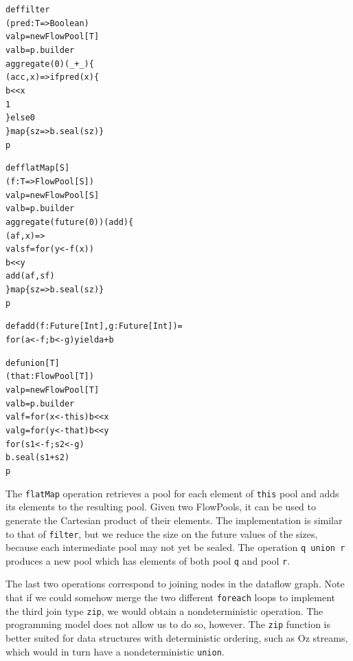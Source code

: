 \documentclass[runningheads,a4paper]{llncs}
\begin{document}
\noindent
\begin{minipage}[b]{4 cm}
\begin{alltt}
{\scriptsize
def filter
  (pred: T => Boolean)
  val p = new FlowPool[T]
  val b = p.builder
  aggregate(0)(_ + _) \{
    (acc, x) => if pred(x) \{
      b << x
      1
    \} else 0
  \} map \{ sz => b.seal(sz) \}
  p



}
\end{alltt}
\end{minipage}\begin{minipage}[b]{4 cm}
\begin{alltt}
{\scriptsize
def flatMap[S]
  (f: T => FlowPool[S])
  val p = new FlowPool[S]
  val b = p.builder
  aggregate(future(0))(add) \{
    (af, x) =>
    val sf = for (y <- f(x))
      b << y
    add(af, sf)
  \} map \{ sz => b.seal(sz) \}
  p

def add(f: Future[Int], g: Future[Int]) =
  for (a <- f; b <- g) yield a + b
}
\end{alltt}
\end{minipage}
\begin{minipage}[b]{4 cm}
\begin{alltt}
{\scriptsize
def union[T]
  (that: FlowPool[T])
  val p = new FlowPool[T]
  val b = p.builder
  val f = for (x <- this) b << x
  val g = for (y <- that) b << y
  for (s1 <- f; s2 <- g)
    b.seal(s1 + s2)
  p





}
\end{alltt}
\end{minipage}

The \verb=flatMap= operation retrieves a pool for each element of
\verb=this= pool and adds its elements to the resulting pool.
Given two FlowPools, it can be used to generate the Cartesian product
of their elements.
The implementation is similar to that of \verb=filter=,
but we reduce the size on the future values of the sizes, because each
intermediate pool may not yet be sealed.
The operation \verb=q union r= produces a new pool which has elements of
both pool \verb=q= and pool \verb=r=.

The last two operations correspond to joining nodes in the dataflow
graph.
Note that if we could somehow merge the two different \verb=foreach=
loops to implement the third join type \verb=zip=, we would
obtain a nondeterministic operation.
The programming model does not allow us to do so, however.
The \verb=zip= function is better suited for data structures with deterministic ordering,
such as Oz streams, which would in turn have a nondeterministic \verb=union=.
\end{document}
